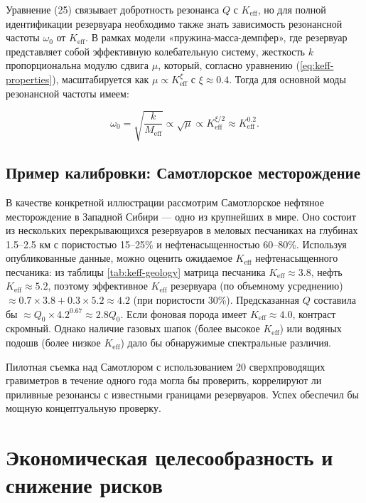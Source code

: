 \documentclass[12pt,a4paper]{article}
\theoremstyle{remark}
\newcommand{\Keff}{K_{\mathrm{eff}}}
\begin{document}
	Уравнение (25) связывает добротность резонанса \(Q\) с \(\Keff\), но для полной идентификации резервуара необходимо также знать зависимость резонансной частоты \(\omega_0\) от \(\Keff\). В рамках модели «пружина-масса-демпфер», где резервуар представляет собой эффективную колебательную систему, жесткость \(k\) пропорциональна модулю сдвига \(\mu\), который, согласно уравнению (\ref{eq:keff-properties}), масштабируется как \(\mu \propto \Keff^{\xi}\) с \(\xi \approx 0.4\). Тогда для основной моды резонансной частоты имеем:
	
	\begin{equation}
		\omega_0 = \sqrt{\frac{k}{M_{\text{eff}}}} \propto \sqrt{\mu} \propto \Keff^{\xi/2} \approx \Keff^{0.2}.
		\label{eq:omega_keff}
	\end{equation}
	
	\subsection{Пример калибровки: Самотлорское месторождение}
	
	В качестве конкретной иллюстрации рассмотрим Самотлорское нефтяное месторождение в Западной Сибири — одно из крупнейших в мире. Оно состоит из нескольких перекрывающихся резервуаров в меловых песчаниках на глубинах 1.5–2.5 км с пористостью 15–25\% и нефтенасыщенностью 60–80\%. Используя опубликованные данные, можно оценить ожидаемое $\Keff$ нефтенасыщенного песчаника: из таблицы \ref{tab:keff-geology} матрица песчаника $\Keff \approx 3.8$, нефть $\Keff \approx 5.2$, поэтому эффективное $\Keff$ резервуара (по объемному усреднению) \(\approx 0.7 \times 3.8 + 0.3 \times 5.2 \approx 4.2\) (при пористости 30\%). Предсказанная $Q$ составила бы \(\approx Q_0 \times 4.2^{0.67} \approx 2.8 Q_0\). Если фоновая порода имеет $\Keff \approx 4.0$, контраст скромный. Однако наличие газовых шапок (более высокое $\Keff$) или водяных подошв (более низкое $\Keff$) дало бы обнаружимые спектральные различия.
	
	Пилотная съемка над Самотлором с использованием 20 сверхпроводящих гравиметров в течение одного года могла бы проверить, коррелируют ли приливные резонансы с известными границами резервуаров. Успех обеспечил бы мощную концептуальную проверку.
	
	\section{Экономическая целесообразность и снижение рисков}
	\label{sec:economics}
	
\end{document}
